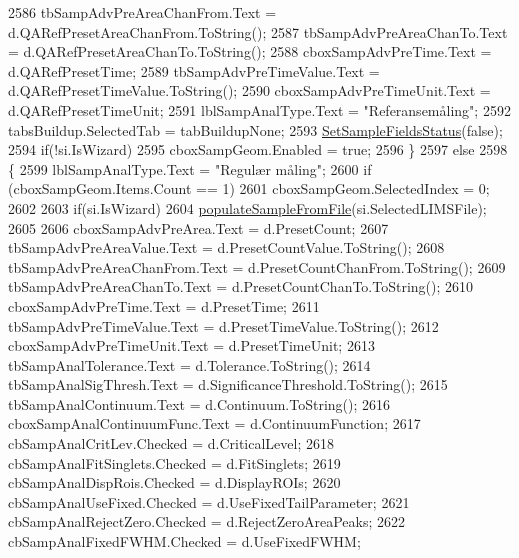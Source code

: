 \begin{DoxyCode}
2586                 tbSampAdvPreAreaChanFrom.Text = d.QARefPresetAreaChanFrom.ToString();
2587                 tbSampAdvPreAreaChanTo.Text = d.QARefPresetAreaChanTo.ToString();
2588                 cboxSampAdvPreTime.Text = d.QARefPresetTime;
2589                 tbSampAdvPreTimeValue.Text = d.QARefPresetTimeValue.ToString();
2590                 cboxSampAdvPreTimeUnit.Text = d.QARefPresetTimeUnit;
2591                 lblSampAnalType.Text = \textcolor{stringliteral}{"Referansemåling"};
2592                 tabsBuildup.SelectedTab = tabBuildupNone;
2593                 \hyperlink{class_scintilab_1_1_form_main_ad85e690e8d5fa96cbf9c0a7632bd7140}{SetSampleFieldsStatus}(\textcolor{keyword}{false});
2594                 \textcolor{keywordflow}{if}(!si.IsWizard)
2595                     cboxSampGeom.Enabled = \textcolor{keyword}{true};
2596             \}
2597             \textcolor{keywordflow}{else}
2598             \{
2599                 lblSampAnalType.Text = \textcolor{stringliteral}{"Regulær måling"};
2600                 \textcolor{keywordflow}{if} (cboxSampGeom.Items.Count == 1)
2601                     cboxSampGeom.SelectedIndex = 0;
2602 
2603                 \textcolor{keywordflow}{if}(si.IsWizard)
2604                     \hyperlink{class_scintilab_1_1_form_main_a93fd0bccb6ec721eca356f868939e68b}{populateSampleFromFile}(si.SelectedLIMSFile);
2605 
2606                 cboxSampAdvPreArea.Text = d.PresetCount;
2607                 tbSampAdvPreAreaValue.Text = d.PresetCountValue.ToString();
2608                 tbSampAdvPreAreaChanFrom.Text = d.PresetCountChanFrom.ToString();
2609                 tbSampAdvPreAreaChanTo.Text = d.PresetCountChanTo.ToString();
2610                 cboxSampAdvPreTime.Text = d.PresetTime;
2611                 tbSampAdvPreTimeValue.Text = d.PresetTimeValue.ToString();
2612                 cboxSampAdvPreTimeUnit.Text = d.PresetTimeUnit;
2613                 tbSampAnalTolerance.Text = d.Tolerance.ToString();
2614                 tbSampAnalSigThresh.Text = d.SignificanceThreshold.ToString();
2615                 tbSampAnalContinuum.Text = d.Continuum.ToString();
2616                 cboxSampAnalContinuumFunc.Text = d.ContinuumFunction;
2617                 cbSampAnalCritLev.Checked = d.CriticalLevel;
2618                 cbSampAnalFitSinglets.Checked = d.FitSinglets;
2619                 cbSampAnalDispRois.Checked = d.DisplayROIs;
2620                 cbSampAnalUseFixed.Checked = d.UseFixedTailParameter;
2621                 cbSampAnalRejectZero.Checked = d.RejectZeroAreaPeaks;
2622                 cbSampAnalFixedFWHM.Checked = d.UseFixedFWHM;

\end{DoxyCode}
